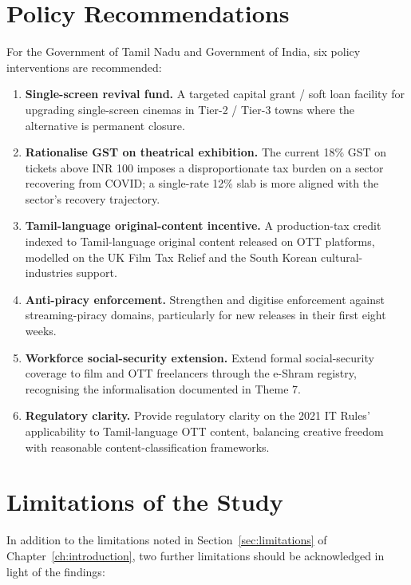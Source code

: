 \section{Policy Recommendations}
\label{sec:policy}

For the Government of Tamil Nadu and Government of India, six
policy interventions are recommended:

\begin{enumerate}[itemsep=2pt]
\item \textbf{Single-screen revival fund.}  A targeted capital
      grant / soft loan facility for upgrading single-screen
      cinemas in Tier-2 / Tier-3 towns where the alternative
      is permanent closure.
\item \textbf{Rationalise GST on theatrical exhibition.}  The
      current 18\% GST on tickets above INR 100 imposes a
      disproportionate tax burden on a sector recovering from
      COVID; a single-rate 12\% slab is more aligned with the
      sector's recovery trajectory.
\item \textbf{Tamil-language original-content incentive.}  A
      production-tax credit indexed to Tamil-language original
      content released on OTT platforms, modelled on the UK Film
      Tax Relief and the South Korean cultural-industries support.
\item \textbf{Anti-piracy enforcement.}  Strengthen and digitise
      enforcement against streaming-piracy domains, particularly
      for new releases in their first eight weeks.
\item \textbf{Workforce social-security extension.}  Extend
      formal social-security coverage to film and OTT freelancers
      through the e-Shram registry, recognising the
      informalisation documented in Theme 7.
\item \textbf{Regulatory clarity.}  Provide regulatory clarity on
      the 2021 IT Rules' applicability to Tamil-language OTT
      content, balancing creative freedom with reasonable
      content-classification frameworks.
\end{enumerate}

\section{Limitations of the Study}
\label{sec:final_limits}

In addition to the limitations noted in
Section~\ref{sec:limitations} of Chapter~\ref{ch:introduction},
two further limitations should be acknowledged in light of the
findings:

